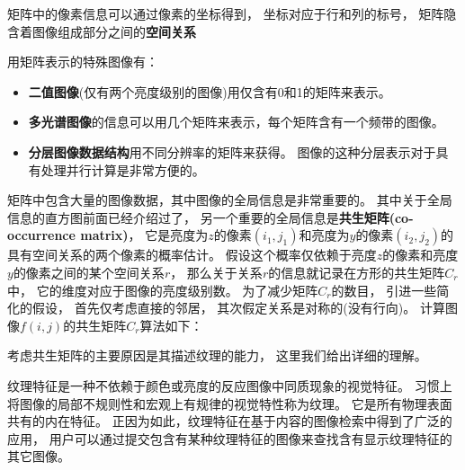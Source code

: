 矩阵中的像素信息可以通过像素的坐标得到，%
坐标对应于行和列的标号，%
矩阵隐含着图像组成部分之间的\textbf{\color{magenta}空间关系}

用矩阵表示的特殊图像有：
\begin{itemize}
\item{\textbf{\color{magenta}二值图像}(仅有两个亮度级别的图像)用仅含有0和1的矩阵来表示。}
\item{\textbf{\color{magenta}多光谱图像}的信息可以用几个矩阵来表示，每个矩阵含有一个频带的图像。}
\item{\textbf{\color{magenta}分层图像数据结构}用不同分辨率的矩阵来获得。%
    图像的这种分层表示对于具有处理并行计算是非常方便的。}
\end{itemize}

矩阵中包含大量的图像数据，其中图像的全局信息是非常重要的。%
其中关于全局信息的直方图前面已经介绍过了，%
另一个重要的全局信息是\textbf{\color{magenta}共生矩阵(co-occurrence matrix)}，%
它是亮度为$z$的像素$(i_{1},j_{1})$和亮度为$y$的像素$(i_{2},j_{2})$的具有空间关系的两个像素的概率估计。%
假设这个概率仅依赖于亮度$z$的像素和亮度$y$的像素之间的某个空间关系$r$，%
那么关于关系$r$的信息就记录在方形的共生矩阵$C_{r}$中，%
它的维度对应于图像的亮度级别数。%
为了减少矩阵$C_{r}$的数目，%
引进一些简化的假设，%
首先仅考虑直接的邻居，%
其次假定关系是对称的(没有行向)。%
计算图像$f(i,j)$的共生矩阵$C_{r}$算法如下：

考虑共生矩阵的主要原因是其描述纹理的能力，%
这里我们给出详细的理解。

纹理特征是一种不依赖于颜色或亮度的反应图像中同质现象的视觉特征。%
习惯上将图像的局部不规则性和宏观上有规律的视觉特性称为纹理。%
它是所有物理表面共有的内在特征。%
正因为如此，纹理特征在基于内容的图像检索中得到了广泛的应用，%
用户可以通过提交包含有某种纹理特征的图像来查找含有显示纹理特征的其它图像。

